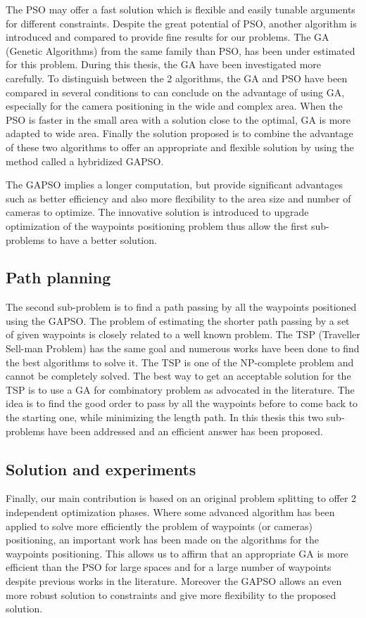  The PSO may offer a fast solution which is flexible and easily tunable arguments for different constraints. Despite the great potential of PSO, another algorithm is introduced and compared to provide fine results for our problems.
The GA (Genetic Algorithms) from the same family than PSO, has been under estimated for this problem. During this thesis, the GA have been investigated more carefully. 
To distinguish between the 2 algorithms, the GA and PSO have been compared in several conditions to can conclude on the advantage of using GA, especially for the camera positioning in the wide and complex area. When the PSO is faster in the small area with a solution close to the optimal, GA is more adapted to wide area.
Finally the solution proposed is to combine the advantage of these two algorithms to offer an appropriate and flexible solution by using the method called a hybridized GAPSO. 

The GAPSO implies a longer computation, but provide significant advantages such as better efficiency and also more flexibility to the area size and number of  cameras to optimize.
The innovative solution is introduced to upgrade optimization of the waypoints positioning problem thus allow the first sub-problems to have a better solution.

\subsection{Path planning}
The second sub-problem is to find a path passing by all the waypoints positioned using the GAPSO. The problem of estimating the shorter path passing by a set of given waypoints is closely related to a well known problem. The TSP (Traveller Sell-man Problem) has the same goal and numerous works have been done to find the best algorithms to solve it. The TSP is one of the NP-complete problem and cannot be completely solved. The best way to get an acceptable solution for the TSP is to use a GA for combinatory problem as advocated in the literature. 
The idea is to find the good order to pass by all the waypoints before to come back to the starting one, while  minimizing the length path. 
In this thesis this two sub-problems have been addressed and an efficient answer has been proposed. 

\subsection{Solution and experiments }
Finally,  our main contribution is based on an original problem splitting to offer 2 independent optimization phases. Where some advanced algorithm has been applied to solve more efficiently the problem of waypoints (or cameras) positioning, an important work has been made on the algorithms for the waypoints positioning. This allows us to affirm that an appropriate GA is more efficient than the PSO for large spaces and for a large number of waypoints despite previous works in the literature. Moreover the GAPSO allows an even more robust solution to constraints and give more flexibility to the proposed solution. 

